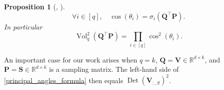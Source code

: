 \documentclass[twoside,11pt]{book}
\newtheorem{proposition}{Proposition}
\newtheorem{example}{Example}
\numberwithin{theorem}{chapter}
\numberwithin{definition}{chapter}
\numberwithin{proposition}{chapter}
\numberwithin{corollary}{chapter}
\numberwithin{example}{chapter}
\numberwithin{lemma}{chapter}
\numberwithin{assumption}{chapter}
\numberwithin{equation}{chapter}
\numberwithin{figure}{chapter}
\DeclareMathOperator{\Det}{Det}
\DeclareMathOperator{\Vol}{Vol}
\DeclareMathOperator{\Tran}{\intercal}
\newcommand{\ab}[1]{\textcolor{red}{#1}}
\begin{document}
\begin{subappendices}
\begin{proposition}[\citealp{BjGo73}, \citealp{Ben92}]
\begin{equation}
 \forall i \in [q], \quad \cos(\theta_{i}) =\sigma_i(\bm{Q}^{\Tran}\bm{P}).
\end{equation}
In particular
\begin{equation}\label{principal_angles_formula}
\Vol_{q}^{2}(\bm{Q}^{\Tran}\bm{P}) = \prod\limits_{i \in [q]} \cos^{2}(\theta_{i}).
\end{equation}
\end{proposition}
An important case for our work arises when $q=k$, $\bm{Q}=\bm{V} \in \mathbb{R}^{d \times k}$, and $\bm{P}=\bm{S}\in \mathbb{R}^{d \times k}$ is a sampling matrix. The left-hand side of \eqref{principal_angles_formula} then equals $\Det(\bm{V}_{:,S})^2$.



%    


\end{subappendices}
\end{document}
